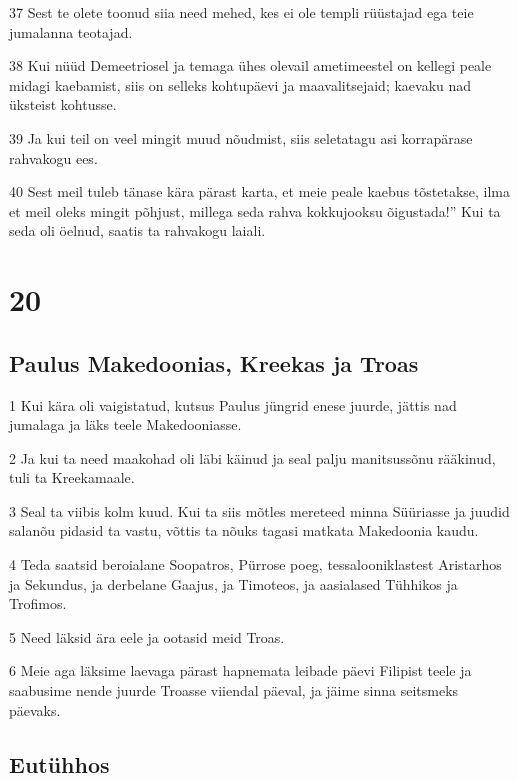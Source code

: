 \par 37 Sest te olete toonud siia need mehed, kes ei ole templi rüüstajad ega teie jumalanna teotajad.
\par 38 Kui nüüd Demeetriosel ja temaga ühes olevail ametimeestel on kellegi peale midagi kaebamist, siis on selleks kohtupäevi ja maavalitsejaid; kaevaku nad üksteist kohtusse.
\par 39 Ja kui teil on veel mingit muud nõudmist, siis seletatagu asi korrapärase rahvakogu ees.
\par 40 Sest meil tuleb tänase kära pärast karta, et meie peale kaebus tõstetakse, ilma et meil oleks mingit põhjust, millega seda rahva kokkujooksu õigustada!” Kui ta seda oli öelnud, saatis ta rahvakogu laiali.


\chapter{20}

\section*{Paulus Makedoonias, Kreekas ja Troas}

\par 1 Kui kära oli vaigistatud, kutsus Paulus jüngrid enese juurde, jättis nad jumalaga ja läks teele Makedooniasse.
\par 2 Ja kui ta need maakohad oli läbi käinud ja seal palju manitsussõnu rääkinud, tuli ta Kreekamaale.
\par 3 Seal ta viibis kolm kuud. Kui ta siis mõtles mereteed minna Süüriasse ja juudid salanõu pidasid ta vastu, võttis ta nõuks tagasi matkata Makedoonia kaudu.
\par 4 Teda saatsid beroialane Soopatros, Pürrose poeg, tessalooniklastest Aristarhos ja Sekundus, ja derbelane Gaajus, ja Timoteos, ja aasialased Tühhikos ja Trofimos.
\par 5 Need läksid ära eele ja ootasid meid Troas.
\par 6 Meie aga läksime laevaga pärast hapnemata leibade päevi Filipist teele ja saabusime nende juurde Troasse viiendal päeval, ja jäime sinna seitsmeks päevaks.

\section*{Eutühhos}

